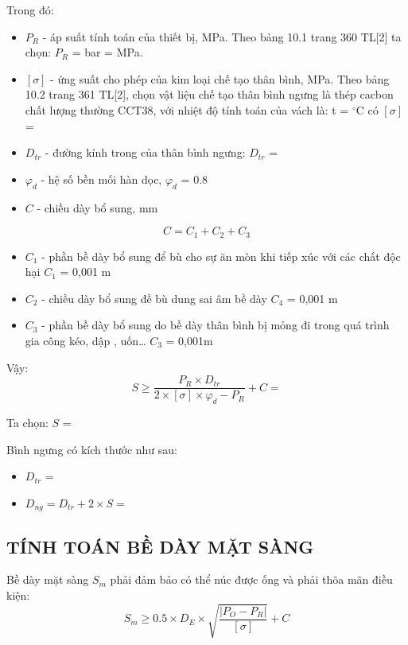 Trong đó:
\begin{itemize}
	\item $P_{R}$ - áp suất tính toán của thiết bị, MPa. Theo bảng 10.1 trang 360 TL[2] ta chọn: $P_{R}$ =  bar =  MPa.
	\item $[\sigma]$ - ứng suất cho phép của kim loại chế tạo thân bình, MPa. Theo bảng 10.2 trang 361 TL[2], chọn vật liệu chế tạo thân bình ngưng là thép cacbon chất lượng thường CCT38, với nhiệt độ tính toán của vách là: t = $^{\circ}$C có $[\sigma]$ = 
	\item $D_{tr}$ - đường kính trong của thân bình ngưng: $D_{tr}$ = 
	\item $\varphi_{d}$ - hệ số bền mối hàn dọc, $\varphi_{d}$ = 0.8
	\item $C$ - chiều dày bổ sung, mm
\end{itemize}
\begin{equation*}
	C = C_{1} + C_{2} + C_{3}
\end{equation*}
\begin{itemize}
	\item $C_{1}$ - phần bề dày bổ sung để bù cho sự ăn mòn khi tiếp xúc với các	chất độc hại $C_{1}$ = 0,001 m
	\item $C_{2}$ - chiều dày bổ sung đề bù dung sai âm bề dày $C_{4}$ = 0,001 m
	\item $C_{3}$ - phần bề dày bổ sung do bề dày thân bình bị mỏng đi trong quá trình gia công kéo, dập , uốn… $C_{3}$ = 0,001m
\end{itemize}

Vậy:
\begin{equation*}
	S \geq \dfrac{P_{R}\times D_{tr}}{2\times [\sigma]\times\varphi_{d} - P_{R}} + C = 
\end{equation*}

Ta chọn: $S$ = 

Bình ngưng có kích thước như sau:
\begin{itemize}[label={$\diamond$}]
	\item $D_{tr}$ = 
	\item $D_{ng} = D_{tr} + 2\times S = $ 
\end{itemize}

\subsection{TÍNH TOÁN BỀ DÀY MẶT SÀNG}
Bề dày mặt sàng $S_{m}$ phải đảm bảo có thể núc được ống và phải thõa mãn điều kiện:
\begin{equation*}
	S_{m} \geq 0.5\times D_{E}\times \sqrt{\dfrac{|P_{O} - P_{R}|}{[\sigma]}} + C
\end{equation*}

